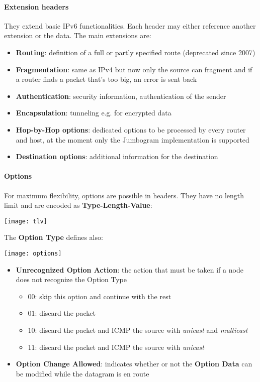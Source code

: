 \paragraph{Extension headers} They extend basic IPv6 functionalities. Each header may either reference another extension or the data. The main extensions are:
\begin{itemize}
	\item \textbf{Routing}: definition of a full or partly specified route (deprecated since 2007)
	\item \textbf{Fragmentation}: same as IPv4 but now only the source can fragment and if a router finds a packet that's too big, an error is sent back
	\item \textbf{Authentication}: security information, authentication of the sender
	\item \textbf{Encapsulation}: tunneling e.g. for encrypted data
	\item \textbf{Hop-by-Hop options}: dedicated options to be processed by every router and host, at the moment only the Jumbogram implementation is supported
	\item \textbf{Destination options}: additional information for the destination
\end{itemize}

\paragraph{Options} For maximum flexibility, options are possible in headers. They have no length limit and are encoded as \textbf{Type-Length-Value}:
\begin{center}
	\texttt{[image: tlv]}
\end{center}
The \textbf{Option Type} defines also:
\begin{center}
	\texttt{[image: options]}
\end{center}
\begin{itemize}
	\item \textbf{Unrecognized Option Action}: the action that must be taken if a node does not recognize the Option Type
	\begin{itemize}
		\item $00$: skip this option and continue with the rest
		\item $01$: discard the packet
		\item $10$: discard the packet and ICMP the source with \textit{unicast} and \textit{multicast}
		\item $11$: discard the packet and ICMP the source with \textit{unicast}
	\end{itemize}
	\item \textbf{Option Change Allowed}: indicates whether or not the \textbf{Option Data} can be modified while the datagram is en route
\end{itemize}

